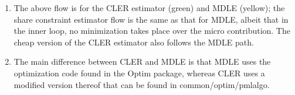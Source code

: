 \documentclass[12pt]{article}
\begin{document}
{\LARGE
\begin{enumerate}
    \item The above flow is for the CLER estimator (green) and MDLE (yellow); the share constraint estimator flow is the same as that for MDLE, albeit that in the inner loop, no minimization takes place over the micro contribution.  The cheap version of the CLER estimator also follows the MDLE path.
    \item The main difference between CLER and MDLE is that MDLE uses the optimization code found in the Optim package, whereas CLER uses a modified version thereof that can be found in common/optim/pmlalgo.
\end{enumerate}
}
\end{document}

